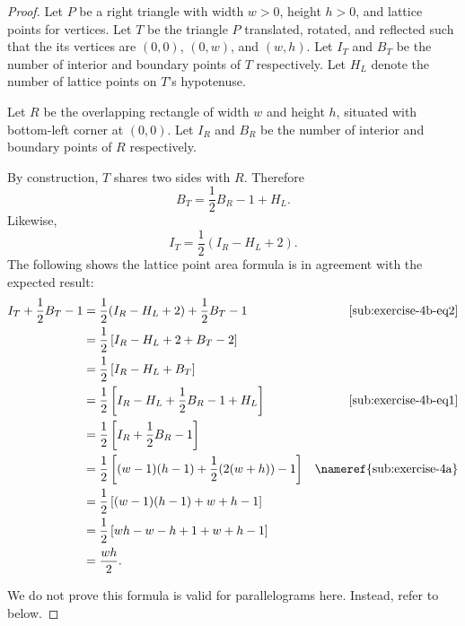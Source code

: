 \documentclass{article}
\begin{document}
\begin{proof}

  Let $P$ be a right triangle with width $w > 0$, height $h > 0$, and lattice
    points for vertices.
  Let $T$ be the triangle $P$ translated, rotated, and reflected such that the
    its vertices are $(0, 0)$, $(0, w)$, and $(w, h)$.
  Let $I_T$ and $B_T$ be the number of interior and boundary points of $T$
    respectively.
  Let $H_L$ denote the number of lattice points on $T$'s hypotenuse.

  Let $R$ be the overlapping rectangle of width $w$ and height $h$, situated
    with bottom-left corner at $(0, 0)$.
  Let $I_R$ and $B_R$ be the number of interior and boundary points
    of $R$ respectively.

  By construction, $T$ shares two sides with $R$.
  Therefore
    \begin{equation}
      \label{sub:exercise-4b-eq1}
      B_T = \frac{1}{2}B_R - 1 + H_L.
    \end{equation}
  Likewise,
    \begin{equation}
      \label{sub:exercise-4b-eq2}
      I_T = \frac{1}{2}(I_R - H_L + 2).
    \end{equation}
  The following shows the lattice point area formula is in agreement with
    the expected result:
    \begin{align*}
      I_T + \frac{1}{2}B_T - 1
        & = \frac{1}{2}(I_R - H_L + 2) + \frac{1}{2}B_T - 1
          & \eqref{sub:exercise-4b-eq2} \\
        & = \frac{1}{2}\left[ I_R - H_L + 2 + B_T - 2 \right] \\
        & = \frac{1}{2}\left[ I_R - H_L + B_T \right] \\
        & = \frac{1}{2}\left[ I_R - H_L + \frac{1}{2}B_R - 1 + H_L \right]
          & \eqref{sub:exercise-4b-eq1} \\
        & = \frac{1}{2}\left[ I_R + \frac{1}{2}B_R - 1 \right] \\
        & = \frac{1}{2}\left[ (w - 1)(h - 1) + \frac{1}{2}(2(w + h)) - 1 \right]
          & \text{\nameref{sub:exercise-4a}} \\
        & = \frac{1}{2}\left[ (w - 1)(h - 1) + w + h - 1 \right] \\
        & = \frac{1}{2}\left[ wh - w - h + 1 + w + h - 1 \right] \\
        & = \frac{wh}{2}.
    \end{align*}

  We do not prove this formula is valid for parallelograms here.
  Instead, refer to  below.

\end{proof}
\end{document}
